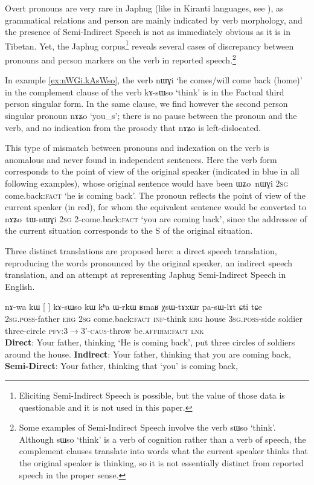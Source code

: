 \documentclass[oldfontcommands,oneside,a4paper,11pt]{article}
\newcommand{\ipa}[1]{{\phon \mbox{#1}}} %
\newcommand{\bleu}[1]{{\color{blue}#1}}
\newcommand{\rouge}[1]{{\color{red}#1}}
\begin{document}
Overt pronouns are very rare in Japhug (like in Kiranti languages, see \citealt{bickel01deictic}), as grammatical relations and person are mainly indicated by verb morphology, and the presence of Semi-Indirect Speech is not as immediately obvious as it is in Tibetan. Yet, the Japhug corpus\footnote{Eliciting Semi-Indirect Speech is possible, but the value of those data is questionable and  it is not used in this paper.} reveals several cases of discrepancy between pronouns and person markers on the verb in reported speech.\footnote{Some examples of Semi-Indirect Speech involve the verb \ipa{sɯso} `think'. Although  \ipa{sɯso} `think' is a verb of cognition rather than a verb of speech, the complement clauses translate into words what the current speaker thinks that the original speaker is thinking, so it is not essentially distinct from reported speech in the proper sense.}


In example \ref{ex:nWGi.kAsWso}, the verb \ipa{nɯɣi} `he comes/will come back (home)' in the complement clause of the verb \ipa{kɤ-sɯso} `think' is in the Factual third person singular form. In the same clause, we find however the second person singular pronoun \ipa{nɤʑo} `you_s'; there is no pause between the pronoun and the verb, and no indication from the prosody that \ipa{nɤʑo} is left-dislocated. 

This type of mismatch  between pronouns and indexation on the verb is anomalous and never found in independent sentences. Here the verb form corresponds to the point of view of the original speaker (indicated in blue in all following examples), whose original sentence would have been \ipa{ɯʑo nɯɣi} \textsc{2sg} {come.back:\textsc{fact}} `he is coming back'. The pronoun reflects the point of view of the current speaker (in red), for whom the equivalent sentence would be converted to \ipa{nɤʑo tɯ-nɯɣi} \textsc{2sg} {2-come.back:\textsc{fact}} `you are coming back', since the addressee of the current situation corresponds to the S of the original situation.

Three distinct translations are proposed here: a direct speech translation, reproducing the words pronounced by the original speaker, an indirect speech translation, and an attempt at representing Japhug Semi-Indirect Speech in English.


\begin{exe}
\ex \label{ex:nWGi.kAsWso}
\gll 
\ipa{nɤ-wa}  	\ipa{kɯ}  	[\rouge{\ipa{nɤʑo}} 	\bleu{\ipa{nɯɣi}}]  	\ipa{kɤ-sɯso}  	\ipa{kɯ}  	\ipa{kʰa}  	\ipa{ɯ-rkɯ}  	\ipa{ʁmaʁ}  	\ipa{χsɯ-tɤxɯr}  	\ipa{pa-sɯ-lɤt}  	\ipa{ɕti}  	\ipa{tɕe}  \\
\textsc{2sg.poss}-father \textsc{erg} \textsc{2sg} {come.back:\textsc{fact}}  \textsc{inf}-think \textsc{erg} house \textsc{3sg.poss}-side soldier three-circle \textsc{pfv:3$\rightarrow$3'-caus}-throw be.\textsc{affirm}:\textsc{fact} \textsc{lnk}\\
\glt \textbf{Direct}: Your father, thinking `\bleu{He is coming back}',   put three circles of soldiers around the house. 
\glt  \textbf{Indirect}: Your father, thinking that \rouge{you are coming back},
\glt  \textbf{Semi-Direct}: Your father, thinking that `\rouge{you}' \bleu{is coming back}, 
\end{exe}
   
\end{document}
